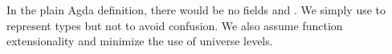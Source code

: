 \begin{code}
\AgdaSymbol{)}\AgdaSpace{}%
\<%
\\
\>[.][@{}l@{}]\<[137I]%
\>[4]\AgdaSymbol{(}\AgdaFunction{Σ[}\AgdaSpace{}%
\AgdaSpace{}%
\AgdaSpace{}%
\AgdaSpace{}%
\AgdaFunction{]}\AgdaSpace{}%
\AgdaSymbol{(}\AgdaSpace{}%
\AgdaSpace{}%
\AgdaSpace{}%
\AgdaSymbol{))}\AgdaSpace{}%
\AgdaOperator{\AgdaInductiveConstructor{,}}\AgdaSpace{}%
\AgdaSpace{}%
\AgdaSpace{}%
\AgdaSpace{}%
\AgdaSpace{}%
\AgdaSpace{}%
\AgdaSpace{}%
\AgdaSymbol{)}\<%
\\
%
\>[2]\AgdaSymbol{;}\AgdaSpace{}%
\AgdaSpace{}%
\AgdaSymbol{=}\AgdaSpace{}%
\AgdaSpace{}%
\AgdaSpace{}%
\AgdaSymbol{(}\AgdaSpace{}%
\AgdaOperator{\AgdaInductiveConstructor{,}}\AgdaSpace{}%
\AgdaSymbol{)}\AgdaSpace{}%
\AgdaSpace{}%
\AgdaSpace{}%
\AgdaOperator{\AgdaInductiveConstructor{,}}\AgdaSpace{}%
\AgdaSpace{}%
\AgdaSpace{}%
\AgdaSpace{}%
\AgdaSpace{}%
\AgdaSymbol{(}\AgdaSpace{}%
\AgdaSymbol{)}\<%
\\
%
\>[2]\AgdaSymbol{;}\AgdaSpace{}%
\AgdaSpace{}%
\AgdaSymbol{=}\AgdaSpace{}%
\AgdaSpace{}%
\AgdaSpace{}%
\AgdaSymbol{(}\AgdaSpace{}%
\AgdaOperator{\AgdaInductiveConstructor{,}}\AgdaSpace{}%
\AgdaSymbol{)}\AgdaSpace{}%
\AgdaSpace{}%
\AgdaSpace{}%
\AgdaOperator{\AgdaInductiveConstructor{,}}\AgdaSpace{}%
\<%
\\
%
\>[2]\AgdaSymbol{;}\AgdaSpace{}%
\AgdaSpace{}%
\AgdaSymbol{=}\AgdaSpace{}%
\AgdaSpace{}%
\AgdaSpace{}%
\AgdaSpace{}%
\AgdaSpace{}%
\AgdaSymbol{(}\AgdaSpace{}%
\AgdaOperator{\AgdaInductiveConstructor{,}}\AgdaSpace{}%
\AgdaSymbol{)}\AgdaSpace{}%
\AgdaSpace{}%
\AgdaSpace{}%
\AgdaOperator{\AgdaInductiveConstructor{,}}\AgdaSpace{}%
\AgdaSpace{}%
\AgdaSpace{}%
\AgdaSpace{}%
\AgdaSpace{}%
\AgdaSymbol{(}\AgdaSpace{}%
\AgdaSymbol{(}\AgdaSpace{}%
\AgdaSymbol{))}\<%
\\
%
\>[2]\AgdaSymbol{\}}\<%
\end{code}

In the plain Agda definition, there would be no fields  and . We simply use  to represent types but not  to avoid confusion. We also assume function extensionality and minimize the use of universe levels.